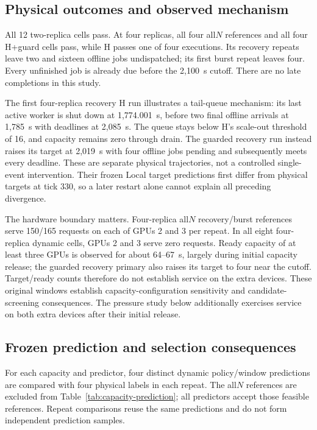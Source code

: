 \subsection{Physical outcomes and observed mechanism}
All 12 two-replica cells pass. At four replicas, all four all$N$ references
and all four H+guard cells pass, while H passes one of four executions.
Its recovery repeats leave two and sixteen offline jobs undispatched;
its first burst repeat leaves four. Every unfinished job is already due
before the 2,100~s cutoff. There are no late completions in this study.

The first four-replica recovery H run illustrates a tail-queue mechanism:
its last active worker is shut down at 1,774.001~s, before two final offline
arrivals at 1,785~s with deadlines at 2,085~s. The queue stays below H's
scale-out threshold of 16, and capacity remains zero through drain.
The guarded recovery run instead raises its target at 2,019~s with four
offline jobs pending and subsequently meets every deadline. These are
separate physical trajectories, not a controlled single-event intervention.
Their frozen Local target predictions first differ from physical targets
at tick 330, so a later restart alone cannot explain all preceding divergence.

The hardware boundary matters. Four-replica all$N$ recovery/burst references
serve 150/165 requests on each of GPUs 2 and 3 per repeat. In all eight
four-replica dynamic cells, GPUs 2 and 3 serve zero requests. Ready capacity
of at least three GPUs is observed for about 64--67~s, largely during initial
capacity release; the guarded recovery primary also raises its target to four
near the cutoff. Target/ready counts therefore do not establish service on
the extra devices. These original windows establish capacity-configuration sensitivity and
candidate-screening consequences. The pressure study below additionally
exercises service on both extra devices after their initial release.

\subsection{Frozen prediction and selection consequences}
For each capacity and predictor, four distinct dynamic policy/window
predictions are compared with four physical labels in each repeat.
The all$N$ references are excluded from Table~\ref{tab:capacity-prediction};
all predictors accept those feasible references. Repeat comparisons reuse
the same predictions and do not form independent prediction samples.

